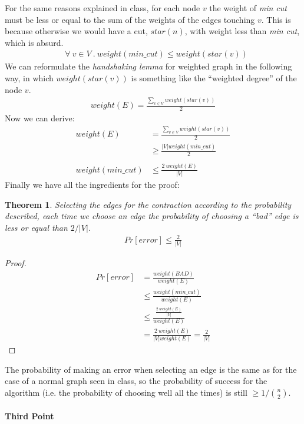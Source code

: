 \documentclass[a4paper]{article}
\newtheorem{theorem}{Theorem}
\begin{document}
For the same reasons explained in class, for each node $v$ the weight of \textit{min cut} must be less or equal to the sum of the weights of the edges touching $v$.
This is because otherwise we would have a cut, $star(n)$, with weight less than \textit{min cut}, which is absurd.
\begin{align*}
&\forall\ v \in V\ .\ weight(min\_cut) \leq weight(star(v)) \tag{3}
\end{align*}
We can reformulate the \textit{handshaking lemma} for weighted graph in the following way, in which $weight(star(v))$ is something like the ``weighted degree'' of the node $v$.
\begin{align*}
weight(E) = \frac{\sum_{v \in V} weight(star(v))}{2} \tag{4}
\end{align*}
Now we can derive:
\begin{align*}
weight(E) &= \frac{\sum_{v \in V} weight(star(v))}{2} \tag{from 4}\\
&\geq \frac{\vert V \vert weight(min\_cut)}{2} \tag{from 3}\\ \\
weight(min\_cut) &\leq \frac{2\ weight(E)}{\vert V \vert} \tag{5}
\end{align*}
Finally we have all the ingredients for the proof:
\begin{theorem}
Selecting the edges for the contraction according to the probability described, each time we choose an edge the probability of choosing a ``bad'' edge is less or equal than $2 / \vert V \vert$.
\begin{align*}
Pr[error] \leq \frac{2}{\vert V \vert}
\end{align*}
\end{theorem}
\begin{proof}
\begin{align*}
Pr[error] &= \frac{weight(BAD)}{weight(E)} \tag{from 1}\\
&\leq \frac{weight(min\_cut)}{weight(E)} \tag{from 2}\\
&\leq \frac{\frac{2\ weight(E)}{\vert V \vert}}{weight(E)} \tag{from 5}\\
&= \frac{2\ weight(E)}{\vert V \vert weight(E)} = \frac{2}{\vert V \vert}
\end{align*}
\end{proof}
The probability of making an error when selecting an edge is the same as for the case of a normal graph seen in class, so the probability of success for the algorithm (i.e. the probability of choosing well all the times) is still $\geq 1/ \binom{n}{2}$.
\\
\\
\noindent
\textbf{Third Point}
\\
\end{document}

